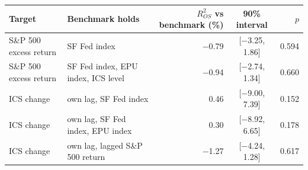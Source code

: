 \begin{tabular}{llrcr}
\toprule
Target & Benchmark holds & $R^2_{OS}$ vs benchmark (\%) & 90\% interval & $p$ \\
\midrule
S\&P 500 excess return & SF Fed index & $-$0.79 & [$-$3.25, 1.86] & 0.594 \\
S\&P 500 excess return & SF Fed index, EPU index, ICS level & $-$0.94 & [$-$2.74, 1.34] & 0.660 \\
\midrule
ICS change & own lag, SF Fed index & 0.46 & [$-$9.00, 7.39] & 0.152 \\
ICS change & own lag, SF Fed index, EPU index & 0.30 & [$-$8.92, 6.65] & 0.178 \\
ICS change & own lag, lagged S\&P 500 return & $-$1.27 & [$-$4.24, 1.28] & 0.617 \\
\bottomrule
\end{tabular}
